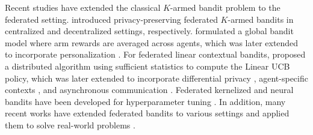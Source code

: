 Recent studies have extended the classical $K$-armed bandit problem to the federated setting. 
\citet{li2022privacy,li2020federated} introduced privacy-preserving federated $K$-armed bandits in centralized and decentralized settings, respectively. \citet{shi2021federated} formulated a global bandit model where arm rewards are averaged across agents, which was later extended to incorporate personalization \citep{shi2021federatedwithpersonalization}. 
For federated linear contextual bandits, \citet{wang2019distributed} proposed a distributed algorithm using sufficient statistics to compute the Linear UCB policy, which was later extended to incorporate differential privacy \citep{dubey2020differentially}, agent-specific contexts \citep{huang2021federated}, and asynchronous communication \citep{li2021asynchronous}. 
Federated kernelized 
and neural bandits have been developed for hyperparameter tuning \citep{dai2020federated,dai2021differentially,dai2022federated}.
In addition, many recent works have extended federated bandits to various settings and applied them to solve real-world problems \cite{li2022communicationkcb,li2022communicationglb,zhu2021federated,ciucanu2022samba,blaser2024federated,fan2024federated,yang2024federated,solanki2024fairness,fourati2024federated,wang2024towards,li2024federated,wei2024incentivized,li2024fedconpe}.


